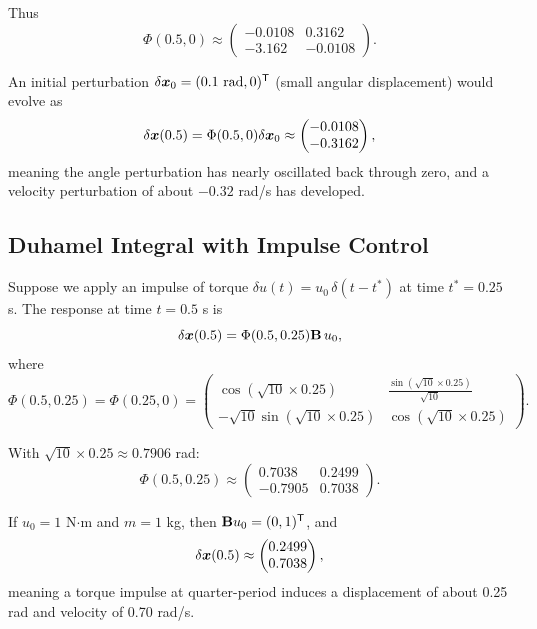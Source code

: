 Thus
\begin{equation}
\Phi(0.5, 0) \approx \begin{pmatrix}-0.0108 & 0.3162\\-3.162 & -0.0108\end{pmatrix}.
\label{eq:ch2:pend-stm-numeric}
\end{equation}

An initial perturbation $\delta\bm{x}_0 = (0.1\text{ rad}, 0)^{\mathsf{T}}$ (small angular displacement) would evolve as
\begin{equation}
\delta\bm{x}(0.5) = \Phi(0.5,0)\delta\bm{x}_0 \approx \begin{pmatrix}-0.0108\\-0.3162\end{pmatrix},
\end{equation}
meaning the angle perturbation has nearly oscillated back through zero, and a velocity perturbation of about
$-0.32$ rad/s has developed.

\subsection{Duhamel Integral with Impulse Control}

Suppose we apply an impulse of torque $\delta u(t) = u_0\,\delta(t-t^*)$ at time $t^* = 0.25$ s.
The response at time $t = 0.5$ s is
\begin{equation}
\delta\bm{x}(0.5) = \Phi(0.5, 0.25)\mathbf{B}\,u_0,
\end{equation}
where
\begin{equation}
\Phi(0.5,0.25) = \Phi(0.25, 0) = \begin{pmatrix}\cos(\sqrt{10} \times 0.25) & \frac{\sin(\sqrt{10} \times 0.25)}{\sqrt{10}}\\
-\sqrt{10}\sin(\sqrt{10} \times 0.25) & \cos(\sqrt{10} \times 0.25)\end{pmatrix}.
\end{equation}

With $\sqrt{10} \times 0.25 \approx 0.7906$ rad:
\begin{equation}
\Phi(0.5,0.25) \approx \begin{pmatrix}0.7038 & 0.2499\\-0.7905 & 0.7038\end{pmatrix}.
\end{equation}

If $u_0 = 1$ N$\cdot$m and $m = 1$ kg, then $\mathbf{B}u_0 = (0, 1)^{\mathsf{T}}$, and
\begin{equation}
\delta\bm{x}(0.5) \approx \begin{pmatrix}0.2499\\0.7038\end{pmatrix},
\end{equation}
meaning a torque impulse at quarter-period induces a displacement of about 0.25 rad and velocity of 0.70 rad/s.

